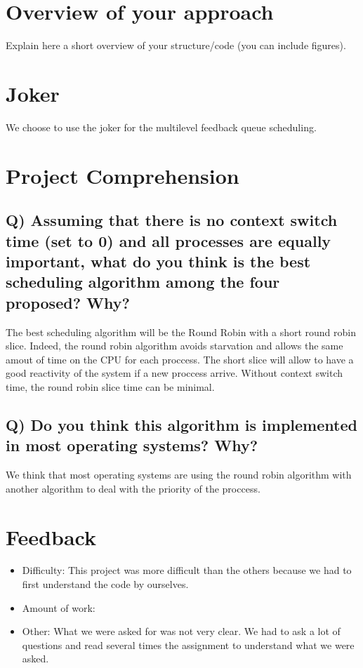 \documentclass[a4paper, 10pt]{article}
\begin{document}
\section*{Overview of your approach}

Explain here a short overview of your structure/code (you can include figures).

\section*{Joker}

We choose to use the joker for the multilevel feedback queue scheduling.


\section*{Project Comprehension}

\subsection*{Q) Assuming that there is no context switch time (set to 0) and all processes are equally important, what do you think is the best scheduling algorithm among the four proposed? Why?}\vspace{0.5cm}

The best scheduling algorithm will be the Round Robin with a short round robin slice. 
Indeed, the round robin algorithm avoids starvation and allows the same amout of time
on the CPU for each proccess. The short slice will allow to have a good reactivity 
of the system if a new proccess arrive. Without context switch time, the round robin slice 
time can be minimal. 

\subsection*{Q) Do you think this algorithm is implemented in most operating systems? Why?}\vspace{0.5cm}

We think that most operating systems are using the round robin algorithm with 
another algorithm to deal with the priority of the proccess. 

\section*{Feedback}

\begin{itemize}
    \item Difficulty: This project was more difficult than the others 
    because we had to first understand the code by ourselves.
    \item Amount of work: %
    \item Other: What we were asked for was not very clear. We had to ask a lot of questions 
    and read several times the assignment to understand what we were asked.
\end{itemize}

 
\end{document}

